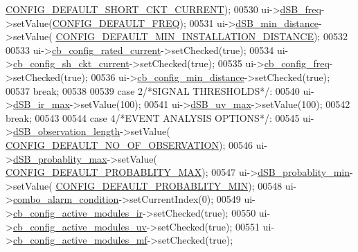 \begin{DoxyCode}
      \hyperlink{a00031_a9b142f2e7d26511af74c411c0e524384}{CONFIG\_DEFAULT\_SHORT\_CKT\_CURRENT});
00530              ui->\hyperlink{a00027_abd528de839feccc001dc62b3aecddc9f}{dSB\_freq}->setValue(\hyperlink{a00031_a985a153b3edd3d7d638137ae0b9e5e67}{CONFIG\_DEFAULT\_FREQ});
00531              ui->\hyperlink{a00027_a01c23085590f4947828948bbd9f50cc7}{dSB\_min\_distance}->setValue(
      \hyperlink{a00031_aad4ef21bb535ed8bbba5a4f2d0451711}{CONFIG\_DEFAULT\_MIN\_INSTALLATION\_DISTANCE});
00532 
00533              ui->\hyperlink{a00027_af4863849ff58931ae3a38aa5b40b8158}{cb\_config\_rated\_current}->setChecked(\textcolor{keyword}{true});
00534              ui->\hyperlink{a00027_a541de6e510677e572ab233f7ecc25e2c}{cb\_config\_sh\_ckt\_current}->setChecked(\textcolor{keyword}{true});
00535              ui->\hyperlink{a00027_a8f501acefacd6343a4ec99a67172f256}{cb\_config\_freq}->setChecked(\textcolor{keyword}{true});
00536              ui->\hyperlink{a00027_a6b0d09f3b380fdb810d3da3f5208ccf5}{cb\_config\_min\_distance}->setChecked(\textcolor{keyword}{true});
00537         \textcolor{keywordflow}{break};
00538 
00539         \textcolor{keywordflow}{case} 2\textcolor{comment}{/*SIGNAL THRESHOLDS*/}:
00540             ui->\hyperlink{a00027_a220706f1fd93857145032c897e55d9e3}{dSB\_ir\_max}->setValue(100);
00541             ui->\hyperlink{a00027_aa2872ada374dace81c4f1cc41d8e244d}{dSB\_uv\_max}->setValue(100);
00542         \textcolor{keywordflow}{break};
00543 
00544         \textcolor{keywordflow}{case} 4\textcolor{comment}{/*EVENT ANALYSIS OPTIONS*/}:
00545             ui->\hyperlink{a00027_a1fe1bf902f2a365c4c94612d2a2ffbcc}{dSB\_observation\_length}->setValue(
      \hyperlink{a00031_af69b35a9f07bfcfe500538565d898c65}{CONFIG\_DEFAULT\_NO\_OF\_OBSERVATION});
00546             ui->\hyperlink{a00027_a137b79e810736643ac4b15e221909871}{dSB\_probablity\_max}->setValue(
      \hyperlink{a00031_a96cf926b530a1d5968881620d2f10445}{CONFIG\_DEFAULT\_PROBABLITY\_MAX});
00547             ui->\hyperlink{a00027_adfd6cf470c736f358c6982f9a635f04f}{dSB\_probablity\_min}->setValue(
      \hyperlink{a00031_a599be42d4b357badb7c9b16a124a186a}{CONFIG\_DEFAULT\_PROBABLITY\_MIN});
00548             ui->\hyperlink{a00027_a2af463e4a88fddd219f2e41a386fbd68}{combo\_alarm\_condition}->setCurrentIndex(0);
00549             ui->\hyperlink{a00027_abef4ef3d5d03026de5d5e172eb0335a6}{cb\_config\_active\_modules\_ir}->setChecked(\textcolor{keyword}{true});
00550             ui->\hyperlink{a00027_a72ad8a6b100948f9b1438cf3b949be5e}{cb\_config\_active\_modules\_uv}->setChecked(\textcolor{keyword}{true});
00551             ui->\hyperlink{a00027_abc96d02b5b7a9480a2a142008e99a100}{cb\_config\_active\_modules\_mf}->setChecked(\textcolor{keyword}{true});

\end{DoxyCode}

